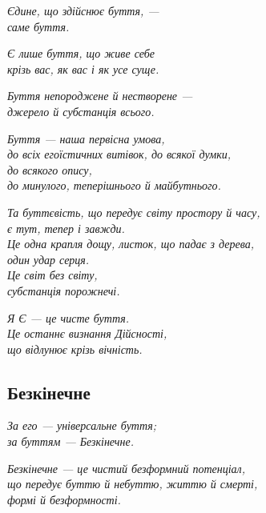 \begin{center}\itshape
Єдине, що здійснює буття, —\\
саме буття.
\end{center}

\begin{center}\itshape
Є лише буття, що живе себе\\
крізь вас, як вас і як усе суще.
\end{center}

\begin{center}\itshape
Буття непороджене й нестворене —\\
джерело й субстанція всього.
\end{center}

\begin{center}\itshape
Буття — наша первісна умова,\\
до всіх егоїстичних витівок, до всякої думки,\\
до всякого опису,\\
до минулого, теперішнього й майбутнього.
\end{center}

\begin{center}\itshape
Та буттєвість, що передує світу простору й часу,\\
є тут, тепер і завжди.\\
Це одна крапля дощу, листок, що падає з дерева,\\
один удар серця.\\
Це світ без світу,\\
субстанція порожнечі.
\end{center}

\begin{center}\itshape
Я Є — це чисте буття.\\
Це останнє визнання Дійсності,\\
що відлунює крізь вічність.
\end{center}

\subsection*{Безкінечне}

\begin{center}\itshape
За его — універсальне буття;\\
за буттям — Безкінечне.
\end{center}

\begin{center}\itshape
Безкінечне — це чистий безформний потенціал,\\
що передує буттю й небуттю, життю й смерті,\\
формі й безформності.
\end{center}


